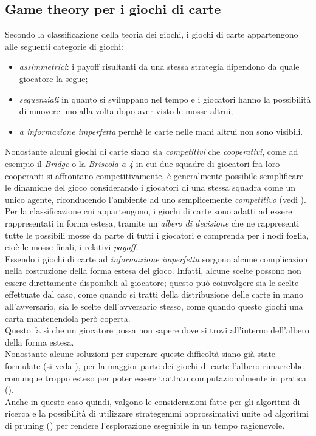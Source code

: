 \subsection{Game theory per i giochi di carte}

Secondo la classificazione della teoria dei giochi, i giochi di carte appartengono alle seguenti categorie di giochi:

\begin{itemize}
   \item \emph{assimmetrici}: i payoff risultanti da una stessa strategia dipendono da quale giocatore la segue;
   \item \emph{sequenziali} in quanto si sviluppano nel tempo e i giocatori hanno la possibilità di muovere uno alla volta dopo aver visto le mosse altrui;
   \item \emph{a informazione imperfetta}  perchè le carte nelle mani altrui non sono visibili.
\end{itemize}

Nonostante alcuni giochi di carte siano sia \emph{competitivi} che \emph{cooperativi}, come ad esempio il \emph{Bridge} o la \emph{Briscola a 4} in cui due squadre di giocatori fra loro cooperanti si affrontano competitivamente, è generalmente possibile semplificare le dinamiche del gioco considerando i giocatori di una stessa squadra come un unico agente, riconducendo l'ambiente ad uno semplicemente \emph{competitivo} (vedi \cite{pavel}).\\
Per la classificazione cui appartengono, i giochi di carte sono adatti ad essere rappresentati in forma estesa, tramite un \emph{albero di decisione} che ne rappresenti tutte le possibili mosse da parte di tutti i giocatori e comprenda per i nodi foglia, cioè le mosse finali, i relativi \emph{payoff}.\\
Essendo i giochi di carte ad \emph{informazione imperfetta} sorgono alcune complicazioni nella costruzione della forma estesa del gioco.
Infatti, alcune scelte possono non essere direttamente disponibili al giocatore; questo può coinvolgere sia le scelte effettuate dal caso, come quando si tratti della distribuzione delle carte in mano all'avversario, sia le scelte dell'avversario stesso, come quando questo giochi una carta mantenendola però coperta.\\
Questo fa sì che un giocatore possa non sapere dove si trovi all'interno dell'albero della forma estesa.\\
Nonostante alcune soluzioni per superare queste difficoltà siano già state formulate (si veda \cite{wiley}), per la maggior parte dei giochi di carte l'albero rimarrebbe comunque troppo esteso per poter essere trattato computazionalmente in pratica (\cite{frank}).\\
Anche in questo caso quindi, valgono le considerazioni fatte per gli algoritmi di ricerca e la possibilità di utilizzare strategemmi approssimativi unite ad algoritmi di pruning (\cite{pavel}) per rendere l'esplorazione eseguibile in un tempo ragionevole.
